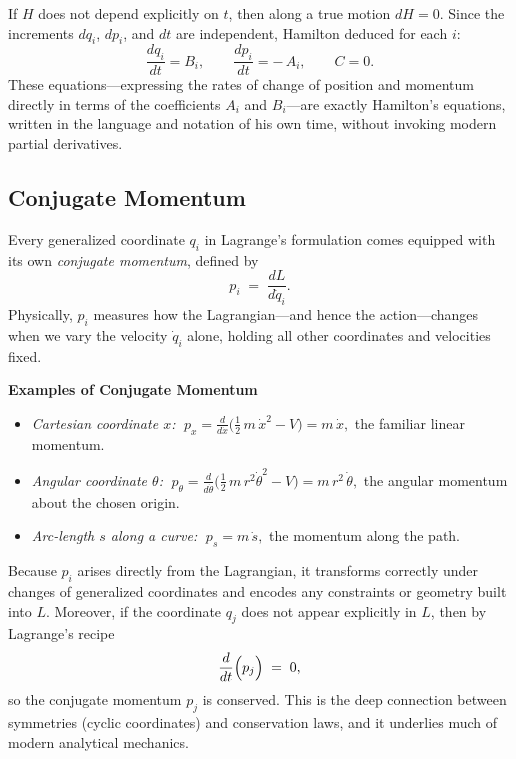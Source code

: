 If \(H\) does not depend explicitly on \(t\), then along a true motion \(dH=0\).  Since the increments \(dq_i\), \(dp_i\), and \(dt\) are independent, Hamilton deduced for each \(i\):
\[
\frac{dq_i}{dt} = B_i,
\qquad
\frac{dp_i}{dt} = -\,A_i,
\qquad
C = 0.
\]
These equations—expressing the rates of change of position and momentum directly in terms of the coefficients \(A_i\) and \(B_i\)—are exactly Hamilton’s equations, written in the language and notation of his own time, without invoking modern partial derivatives. 



\subsection{Conjugate Momentum}

Every generalized coordinate \(q_i\) in Lagrange’s formulation comes equipped with its own \emph{conjugate momentum}, defined by
\[
p_i \;=\;\frac{dL}{d\dot q_i}.
\]
Physically, \(p_i\) measures how the Lagrangian—and hence the action—changes when we vary the velocity \(\dot q_i\) alone, holding all other coordinates and velocities fixed.

\medskip

\noindent\textbf{Examples of Conjugate Momentum}
\begin{itemize}
  \item \emph{Cartesian coordinate \(x\):} \(\;p_x = \tfrac{d}{d\dot x}\bigl(\tfrac12\,m\,\dot x^2 - V\bigr) = m\,\dot x,\) the familiar linear momentum.
  \item \emph{Angular coordinate \(\theta\):} \(\;p_\theta = \tfrac{d}{d\dot\theta}\bigl(\tfrac12\,m\,r^2\dot\theta^2 - V\bigr) = m\,r^2\,\dot\theta,\) the angular momentum about the chosen origin.
  \item \emph{Arc‐length \(s\) along a curve:} \(\;p_s = m\,\dot s,\) the momentum along the path.
\end{itemize}

\bigskip
Because \(p_i\) arises directly from the Lagrangian, it transforms correctly under changes of generalized coordinates and encodes any constraints or geometry built into \(L\).  Moreover, if the coordinate \(q_j\) does not appear explicitly in \(L\), then by Lagrange’s recipe
\[
\frac{d}{dt}\Bigl(p_j\Bigr) \;=\; 0,
\]
so the conjugate momentum \(p_j\) is conserved.  This is the deep connection between symmetries (cyclic coordinates) and conservation laws, and it underlies much of modern analytical mechanics.  

